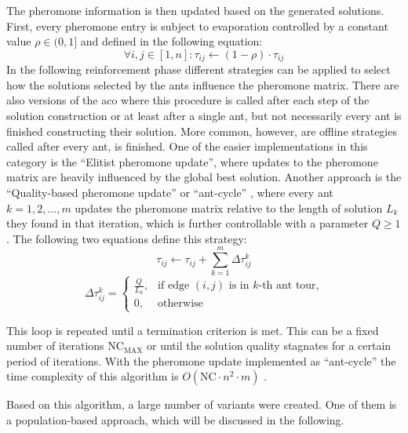 The pheromone information is then updated based on the generated solutions. First, every pheromone entry is subject to evaporation controlled by a constant value $\rho \in (0,1]$ and defined in the following equation:
\begin{equation}
	\label{eq:aco_evap}
	\forall i,j \in [1,n]: \tau_{ij} \leftarrow (1-\rho) \cdot \tau_{ij}
\end{equation}
In the following reinforcement phase different strategies can be applied to select how the solutions selected by the ants influence the pheromone matrix. There are also versions of the \gls{aco} where this procedure is called after each step of the solution construction or at least after a single ant, but not necessarily every ant is finished constructing their solution. More common, however, are offline strategies called after every ant, is finished. One of the easier implementations in this category is the \enquote{Elitist pheromone update}, where updates to the pheromone matrix are heavily influenced by the global best solution. Another approach is the \enquote{Quality-based pheromone update} or \enquote{ant-cycle} \cite{dorigo1996ant}, where every ant $k = 1,2,...,m$ updates the pheromone matrix relative to the length of solution $L_k$ they found in that iteration, which is further controllable with a parameter $Q \geq 1$. The following two equations define this strategy:
\begin{equation}
	\tau_{ij} \leftarrow \tau_{ij} + \sum_{k=1}^{m} \Delta\tau_{ij}^k 
\end{equation}
\begin{equation}
	\Delta\tau_{ij}^k = \begin{cases}
		\frac{Q}{L_k}, &\text{if edge } (i,j) \text{ is in $k$-th ant tour,} \\
		0, &\text{otherwise}
	\end{cases}
\end{equation}

This loop is repeated until a termination criterion is met. This can be a fixed number of iterations $\text{NC}_{\text{MAX}}$ or until the solution quality stagnates for a certain period of iterations. With the pheromone update implemented as \enquote{ant-cycle} the time complexity of this algorithm is $O(\text{NC}\cdot n^2 \cdot m)$ \cite{dorigo1996ant}.

Based on this algorithm, a large number of variants were created. One of them is a population-based approach, which will be discussed in the following.

